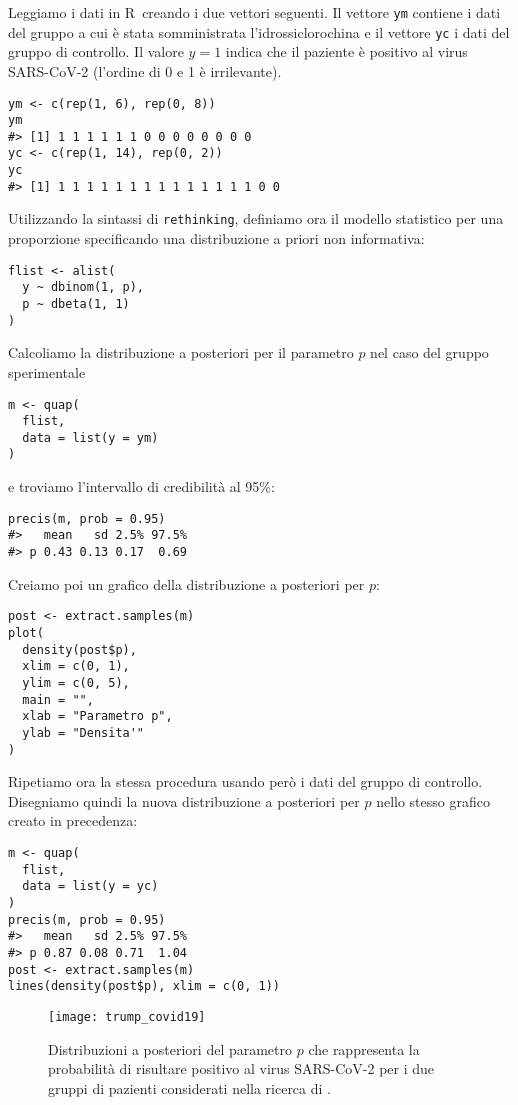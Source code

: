 Leggiamo i dati in R\, creando i due vettori seguenti.
Il vettore \verb+ym+ contiene i dati del gruppo a cui è stata somministrata l'idrossiclorochina e il vettore \verb+yc+ i dati del gruppo di controllo.
Il valore $y = 1$ indica che il paziente è positivo al virus SARS-CoV-2 (l'ordine di 0 e 1 è irrilevante).
\begin{lstlisting}
ym <- c(rep(1, 6), rep(0, 8))
ym
#> [1] 1 1 1 1 1 1 0 0 0 0 0 0 0 0
yc <- c(rep(1, 14), rep(0, 2))
yc
#> [1] 1 1 1 1 1 1 1 1 1 1 1 1 1 1 0 0
\end{lstlisting}
\noindent
Utilizzando la sintassi di \verb+rethinking+, definiamo ora il modello statistico per una proporzione specificando una distribuzione a priori non informativa:
\begin{lstlisting}
flist <- alist(
  y ~ dbinom(1, p),
  p ~ dbeta(1, 1) 
)
\end{lstlisting}
\noindent
Calcoliamo la distribuzione a posteriori per il parametro $p$ nel caso del gruppo sperimentale
\begin{lstlisting}
m <- quap( 
  flist, 
  data = list(y = ym)
)
\end{lstlisting}
\noindent
e troviamo l'intervallo di credibilità al 95\%:
\begin{lstlisting}
precis(m, prob = 0.95)
#>   mean   sd 2.5% 97.5%
#> p 0.43 0.13 0.17  0.69
\end{lstlisting}
\noindent
Creiamo poi un grafico della distribuzione a posteriori per $p$:
\begin{lstlisting}
post <- extract.samples(m)
plot(
  density(post$p), 
  xlim = c(0, 1),
  ylim = c(0, 5),
  main = "",
  xlab = "Parametro p",
  ylab = "Densita'"
)
\end{lstlisting}
\noindent
Ripetiamo ora la stessa procedura usando però i dati del gruppo di controllo.
Disegniamo quindi la nuova distribuzione a posteriori per $p$ nello stesso grafico creato in precedenza:
\begin{lstlisting}
m <- quap( 
  flist, 
  data = list(y = yc)
)
precis(m, prob = 0.95)
#>   mean   sd 2.5% 97.5%
#> p 0.87 0.08 0.71  1.04
post <- extract.samples(m)
lines(density(post$p), xlim = c(0, 1))
\end{lstlisting}

\begin{figure} %
 \centering
 \texttt{[image: trump\_covid19]}
 \caption{Distribuzioni a posteriori del parametro $p$ che rappresenta la probabilità di risultare positivo al virus SARS-CoV-2 per i due gruppi di pazienti considerati nella ricerca di \citet{Gautret_2020}.
}
\label{fig:trump_covid19}
\end{figure}

